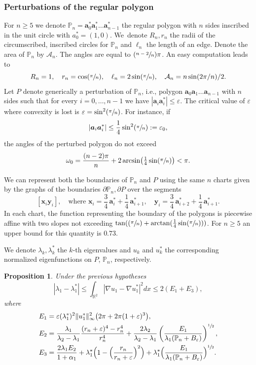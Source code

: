 \documentclass[11pt]{article}
\newcommand{\ie}{i.e.,\xspace}
\numberwithin{equation}{section}\newtheorem*{jepEnonce}{\jepEnonceTitle}\newenvironment{enonce*}[1]{\def\jepEnonceTitle{#1}\jepEnonce}{\endjepEnonce}\newtheorem*{conj*}{Conjecture}
\newcommand{\Psfrac}[2]{(\sfrac{#1}{#2})}
\theoremstyle{plain}
\newtheorem{propo}[thm]{Proposition}
\theoremstyle{definition}
\newcommand{\bo}[1]{{\boldsymbol#1}}
\let\Bbb\mathbb
\def\R{\mathbb{R}}
\newcommand{\vps}{\varepsilon}
\newcommand{\lb}{\lambda}
\let\jepOriginalSfrac\sfrac
\renewcommand{\sfrac}[2]{{\jepOriginalSfrac{#1}{#2}}}
\begin{document}
\subsubsection*{Perturbations of the regular polygon}
For $n \ge 5$ we denote $\mathbb P_n=\bo a_0^* \bo a_1^* \dots \bo a_{n-1}^*$ the regular polygon with $n$ sides inscribed in the unit circle with $a_0^*=(1,0)$. We~denote $R_n, r_n$ the radii of the circumscribed, inscribed circles for $\mathbb P_n$ and $\ell_n$ the length of an edge. Denote the area of $\Bbb P_n$ by $\mathcal A_n$. The angles are equal to $\Psfrac{n-2}{n}\pi$.
An easy computation leads to
\[
R_n=1,\quad r_n = \cos \Psfrac{\pi}{n},\quad  \ell_n = 2 \sin \Psfrac{\pi}{n},\quad  \mathcal A_n = n\sin (2\pi/n)/2.
\]
Let $P$ denote generically a perturbation of $\mathbb P_n$, \ie polygon $\bo a_0 \bo a_1\dots \bo a_{n-1}$ with $n$ sides such that for every $i=0, \dots, n-1$ we have $|\bo a_i\bo a^*_i|\le \vps$. The critical value of $\vps$ where convexity is lost is $\vps= \sin^2 \Psfrac {\pi}{n}$. For instance, if
\[
|\bo a_i\bo a_i^*|\le \frac 14 \sin^2 \Psfrac{\pi}{n}:= \vps_0,
\]
the angles of the perturbed polygon do not exceed
\[
\omega_{0} = \frac{(n-2)\pi}{n} +2 \arcsin \bigl(\tfrac 14 \sin \Psfrac{\pi}{n}\bigr)<\pi.
\]

We can represent both the boundaries of $\Bbb P_n$ and $P$ using the same $n$ charts given by the graphs of the boundaries $\partial \Bbb P_n, \partial P$ over the segments
\[
[\bo x_i \bo y_{i}],\quad\text{where } \bo x_i = \frac 34\, \bo a_i^*+\frac 14\, \bo a_{i+1}^*,\quad \bo y_i= \frac 34\, \bo a_{i+2}^*+\frac 14\, \bo a_{i+1}^*.
\]
In each chart, the function representing the boundary of the polygons is piecewise affine with two slopes not exceeding $\tan (\Psfrac{\pi}{n}+ \arctan (\frac 14 \sin \Psfrac{\pi}{n}))$. For $n \ge 5$ an upper bound for this quantity is $ 0.73 $.

We denote $\lb_k, \lb_k^*$ the $k$-th eigenvalues and $u_k$ and $u_k^*$ the corresponding normalized eigenfunctions on $P$, $\Bbb P_n$, respectively.
\begin{propo}\label{bb03}
Under the previous hypotheses
\begin{equation}\label{bb04}
|\lb_1 -\lb_1^*|\le \int_{\R^2} |\nabla u_1 -\nabla u_1^* |^2 dx \le 2(E_1+E_3),
\end{equation}
where
\begin{align*}
E_1 &= \vps (\lb_1^*)^2 \|u_1^*\|_\infty^2 \big (2\pi+2\pi(1+\varepsilon)^3
\big),
\\
E_2&= \frac{\lb_1}{\lb_2-\lb_1}\frac{(r_n+\vps)^4-r_n^4}{r_n^4} + \frac{2\lb_2}{\lb_2-\lb_1}\left (\frac{E_1}{\lb_1(\Bbb P_n+ B_\vps)}\right)^{\sfrac12},
\\
E_3&=\frac{2 \lb_1 E_2}{1+\alpha_1}+\lb_1^*\Bigl(1- \Bigl(\frac{r_n}{r_n+\vps}\Bigr)^2\Bigr)+\lb_1^* \Bigl(\frac{E_1}{\lb_1(\Bbb P_n + B_\vps)}\Bigr)^{\sfrac12}.
\end{align*}
\end{propo}
\end{document}
